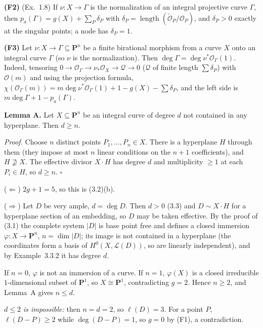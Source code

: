 \documentclass[11pt]{article}
\begin{document}
\textbf{(F2)} (Ex.~1.8) If $\nu:X\to\Gamma$ is the normalization of an integral projective curve $\Gamma$, then $p_a(\Gamma)=g(X)+\sum_{P}\delta_P$ with $\delta_P=\operatorname{length}(\tilde{\mathcal O}_P/\mathcal O_P)$, and $\delta_P>0$ exactly at the singular points; a node has $\delta_P=1$.

\textbf{(F3)} Let $\nu:X\to\Gamma\subseteq\mathbf P^n$ be a finite birational morphism from a curve $X$ onto an integral curve $\Gamma$ (so $\nu$ is the normalization). Then $\deg\Gamma=\deg\nu^*\mathcal O_\Gamma(1)$. Indeed, tensoring $0\to\mathcal O_\Gamma\to\nu_*\mathcal O_X\to\mathcal Q\to0$ ($\mathcal Q$ of finite length $\sum\delta_P$) with $\mathcal O(m)$ and using the projection formula, $\chi(\mathcal O_\Gamma(m))=m\deg\nu^*\mathcal O_\Gamma(1)+1-g(X)-\sum\delta_P$, and the left side is $m\deg\Gamma+1-p_a(\Gamma)$.

\textbf{Lemma A.} Let $X\subseteq\mathbf P^n$ be an integral curve of degree $d$ not contained in any hyperplane. Then $d\ge n$.

\emph{Proof.} Choose $n$ distinct points $P_1,\dots,P_n\in X$. There is a hyperplane $H$ through them (they impose at most $n$ linear conditions on the $n+1$ coefficients), and $H\not\supseteq X$. The effective divisor $X\cdot H$ has degree $d$ and multiplicity $\ge1$ at each $P_i\in H$, so $d\ge n$. \hfill$\square$

\pf
($\Leftarrow$) $2g+1=5$, so this is (3.2)(b).

($\Rightarrow$) Let $D$ be very ample, $d=\deg D$. Then $d>0$ (3.3) and $D\sim X\cdot H$ for a hyperplane section of an embedding, so $D$ may be taken effective. By the proof of (3.1) the complete system $|D|$ is base point free and defines a closed immersion $\varphi:X\to\mathbf P^n$, $n=\dim|D|$; its image is not contained in a hyperplane (the coordinates form a basis of $H^0(X,\mathcal L(D))$, so are linearly independent), and by Example~3.3.2 it has degree $d$.

If $n=0$, $\varphi$ is not an immersion of a curve. If $n=1$, $\varphi(X)$ is a closed irreducible $1$-dimensional subset of $\mathbf P^1$, so $X\cong\mathbf P^1$, contradicting $g=2$. Hence $n\ge2$, and Lemma~A gives $n\le d$.

\emph{$d\le2$ is impossible:} then $n=d=2$, so $\ell(D)=3$. For a point $P$, $\ell(D-P)\ge2$ while $\deg(D-P)=1$, so $g=0$ by (F1), a contradiction.
\end{document}
